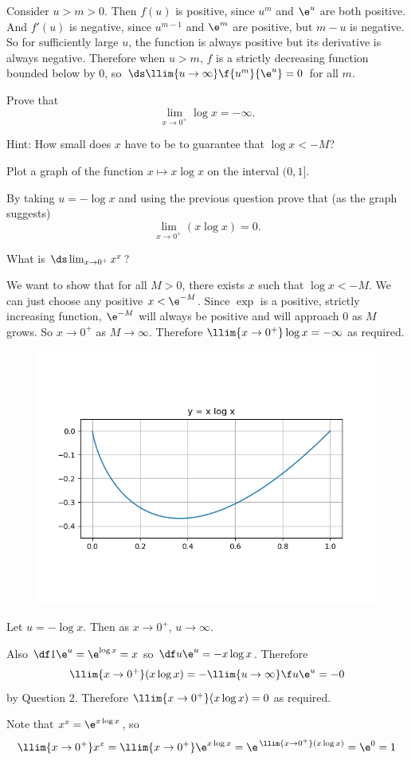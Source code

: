 \documentclass[a4paper]{article}
\begin{document}
Consider $u > m > 0$. Then $f(u)$ is positive, since $u^m$ and $\e^u$ are both positive. And $f'(u)$ is negative, since $u^{m-1}$ and $\e^m$ are positive, but $m - u$ is negative. So for sufficiently large $u$, the function is always positive but its derivative is always negative. Therefore when $u > m$, $f$ is a strictly decreasing function bounded below by $0$, so $\ds \llim{u \to \infty} \f{u^m}{\e^u} = 0$ for all $m$.


\begin{questionbody}
Prove that \[
\lim_{x \to 0^+} \log x = -\infty.
\]

Hint: How small does $x$ have to be to guarantee that $\log x < -M$?

Plot a graph of the function $x \mapsto x \log x$ on the interval $(0, 1]$. %

By taking $u = -\log x$ and using the previous question prove that (as the graph suggests) \[
\lim_{x \to 0^+} (x \log x) = 0.
\]

What is $\ds \lim_{x \to 0^+} x^x$?
\end{questionbody}

We want to show that for all $M > 0$, there exists $x$ such that $\log x < -M$. We can just choose any positive $x < \e^{-M}$. Since $\exp$ is a positive, strictly increasing function, $\e^{-M}$ will always be positive and will approach 0 as $M$ grows. So $x \to 0^+$ as $M \to \infty$. Therefore $\llim{x \to 0^+} \log x = -\infty$ as required.

\begin{figure}[h]
    \centering
    \includegraphics[scale=0.85]{xlogx}
\end{figure}

\newpage
Let $u = -\log x$. Then as $x \to 0^+$, $u \to \infty$.

Also $\df1{\e^u} = \e^{\log x} = x$ so $\df u{\e^u} = -x \log x$. Therefore \[
\llim{x \to 0^+} (x \log x) = -\llim{u \to \infty} \f u{\e^u} = -0
\] by Question 2. Therefore $\llim{x \to 0^+} (x \log x) = 0$ as required.

Note that $x^x = \e^{x \log x}$, so \[
\llim{x \to 0^+} x^x = \llim{x \to 0^+} \e^{x \log x} = \e^{\,\llim{x \to 0^+} (x \log x)} = \e^0 = 1
\]
\end{document}
